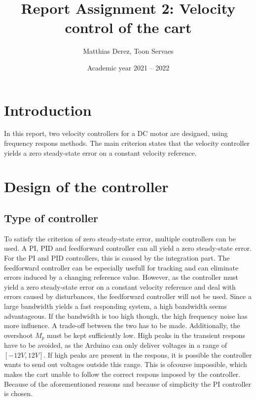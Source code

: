 \documentclass[a4paper,kul]{kulakarticle} %
\date{Academic year 2021 -- 2022}
\title{Report Assignment 2: Velocity control of the cart}
\author{Matthias Derez, Toon Servaes}
\begin{document}
\maketitle

\tableofcontents
\listoffigures
\listoftables

\newpage
\section{Introduction}
In this report, two velocity controllers for a DC motor are designed, using frequency respons methods. The main criterion states that the velocity controller yields a zero steady-state error on a constant velocity reference. 
\section{Design of the controller}
\subsection{Type of controller}
\label{sec: typecontroller}
To satisfy the criterion of zero steady-state error, multiple controllers can be used. A PI, PID and feedforward controller can all yield a zero steady-state error. For the PI and PID controllers, this is caused by the integration part. The feedforward controller can be especially usefull for tracking and can eliminate errors induced by a changing reference value. However, as the controller must yield a zero steady-state error on a constant velocity reference and deal with errors caused by disturbances, the feedforward controller will not be used. Since a large bandwidth yields a fast responding system, a high bandwidth seems advantageous. If the bandwidth is too high though, the high frequency noise has more influence. A trade-off between the two has to be made. Additionally, the overshoot $M_p$ must be kept sufficiently low. High peaks in the transient respons have to be avoided, as the Arduino can only deliver voltages in a range of $[-12V, 12V]$. If high peaks are present in the respons, it is possible the controller wants to send out voltages outside this range. This is ofcourse impossible, which makes the cart unable to follow the correct respons imposed by the controller. %
Because of the aforementioned reasons and because of simplicity the PI controller is chosen.
\end{document}
